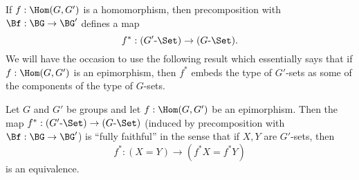 If $f:\Hom(G,G')$ is a homomorphism, then precomposition with $\Bf:\BG\to \BG'$ defines a map $$f^*:(G'\text{-}\Set)\to(G\text{-}\Set).$$
We will have the occasion to use the following result which essentially says that if $f:\Hom(G,G')$ is an epimorphism, then $f^*$ embeds the type of $G'$-sets as some of the components of the type of $G$-sets.
\begin{lemma}
  \label{lem:epifullyfaithful}
  Let $G$ and $G'$ be groups and let $f:\Hom(G,G')$ be an epimorphism.
  Then the map $f^*:(G'\text{-}\Set)\to(G\text{-}\Set)$ (induced by precomposition with $\Bf:\BG\to \BG'$) is ``fully faithful'' in the sense that if $X,Y$ are $G'$-sets, then
$$f^*:(X=Y)\to(f^*X=f^*Y)
$$
is an equivalence.
\end{lemma}
